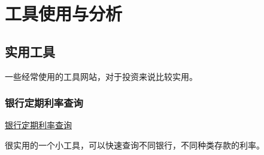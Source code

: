 \chapter{工具使用与分析}

\section{实用工具}

一些经常使用的工具网站，对于投资来说比较实用。

\subsection{银行定期利率查询}

\href{https://bank.cngold.org/yhckll/}{银行定期利率查询}

很实用的一个小工具，可以快速查询不同银行，不同种类存款的利率。

